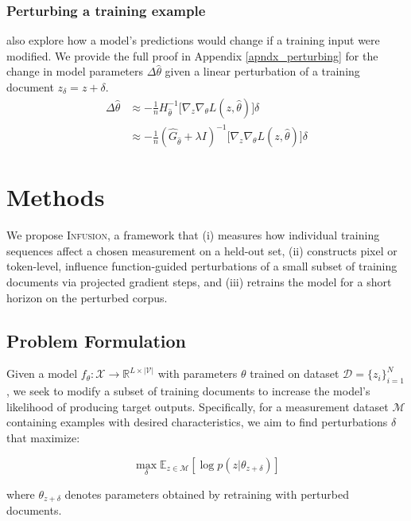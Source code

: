 \documentclass{article}
\theoremstyle{plain}
\theoremstyle{definition}
\theoremstyle{remark}
\begin{document}
\subsubsection{Perturbing a training example}
\citet{koh2017understanding} also explore how a model's predictions would change if a training input were modified. We provide the full proof in Appendix \ref{apndx_perturbing} for the change in model parameters $\Delta \hat \theta$ given a linear perturbation of a training document $z_\delta = z + \delta $.
\begin{align}
\Delta\hat\theta &\approx -\frac{1}{n} H_{\hat{\theta}}^{-1} \big[ \nabla_z \nabla_\theta L(z, \hat\theta)\big]\delta \\
&\approx -\frac{1}{n} (\hat G_{\hat\theta} + \lambda I)^{-1} \big[ \nabla_z \nabla_\theta L(z, \hat\theta)\big]\delta
\label{eq:pert}
\end{align}



\section{Methods}

We propose \textsc{Infusion}, a framework that (i) measures how individual training sequences affect a chosen measurement on a held-out set, (ii) constructs pixel or token-level, influence function-guided perturbations of a small subset of training documents via projected gradient steps, and (iii) retrains the model for a short horizon on the perturbed corpus.


\subsection{Problem Formulation}

Given a model $f_\theta: \mathcal{X} \rightarrow \mathbb{R}^{L \times |\mathcal{V}|}$ with parameters $\theta$ trained on dataset $\mathcal{D} = \{z_i\}_{i=1}^N$, we seek to modify a subset of training documents to increase the model's likelihood of producing target outputs. Specifically, for a measurement dataset $\mathcal{M}$ containing examples with desired characteristics, we aim to find perturbations $\delta$ that maximize:

\begin{equation}
\max_{\delta} \mathbb{E}_{z \in \mathcal{M}} \left[ \log p(z | \theta_{z+\delta}) \right]
\end{equation}

where $\theta_{z+\delta}$ denotes parameters obtained by retraining with perturbed documents.
\end{document}
